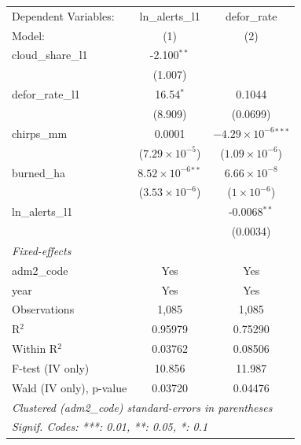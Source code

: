 \begingroup
\centering
\begin{tabular}{lcc}
   \tabularnewline \midrule \midrule
   Dependent Variables:    & ln\_alerts\_l1               & defor\_rate\\   
   Model:                  & (1)                          & (2)\\  
   \midrule
   cloud\_share\_l1        & -2.100$^{**}$                &   \\   
                           & (1.007)                      &   \\   
   defor\_rate\_l1         & 16.54$^{*}$                  & 0.1044\\   
                           & (8.909)                      & (0.0699)\\   
   chirps\_mm              & 0.0001                       & $-4.29\times 10^{-6}$$^{***}$\\    
                           & ($7.29\times 10^{-5}$)       & ($1.09\times 10^{-6}$)\\    
   burned\_ha              & $8.52\times 10^{-6}$$^{**}$  & $6.66\times 10^{-8}$\\    
                           & ($3.53\times 10^{-6}$)       & ($1\times 10^{-6}$)\\    
   ln\_alerts\_l1          &                              & -0.0068$^{**}$\\   
                           &                              & (0.0034)\\   
   \midrule
   \emph{Fixed-effects}\\
   adm2\_code              & Yes                          & Yes\\  
   year                    & Yes                          & Yes\\  
   \midrule
   Observations            & 1,085                        & 1,085\\  
   R$^2$                   & 0.95979                      & 0.75290\\  
   Within R$^2$            & 0.03762                      & 0.08506\\  
   F-test (IV only)        & 10.856                       & 11.987\\  
   Wald (IV only), p-value & 0.03720                      & 0.04476\\  
   \midrule \midrule
   \multicolumn{3}{l}{\emph{Clustered (adm2\_code) standard-errors in parentheses}}\\
   \multicolumn{3}{l}{\emph{Signif. Codes: ***: 0.01, **: 0.05, *: 0.1}}\\
\end{tabular}
\par\endgroup
